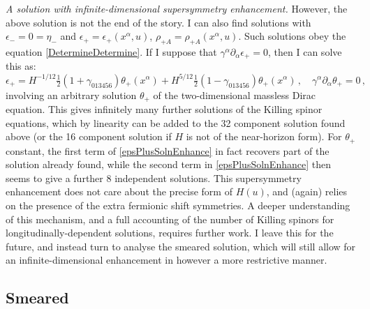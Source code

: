 \documentclass[11pt]{article}
\newcommand{\be}{\begin{equation}}
\newcommand{\ee}{\end{equation}}
\numberwithin{equation}{section}
\begin{document}
{{\vspace{1em}
\noindent \emph{A solution with infinite-dimensional supersymmetry enhancement.}
However, the above solution is not the end of the story.
I can also find solutions with $\epsilon_- = 0 = \eta_-$ and $\epsilon_+ = \epsilon_+(x^\alpha,u)$, $\rho_{+A} = \rho_{+A}(x^\alpha, u)$.
Such solutions obey the equation \eqref{DetermineDetermine}.
If I suppose that $\gamma^\alpha \partial_\alpha \epsilon_+ = 0$, then I can solve this as:
\be
\epsilon_+ = H^{-1/12} \tfrac12 ( 1 + \gamma_{013456} ) \theta_+ (x^\alpha) + H^{5/12} \tfrac12 ( 1 - \gamma_{013456} ) \theta_+ (x^\alpha) \,,\quad
\gamma^\alpha \partial_\alpha  \theta_+ = 0 \,,
\label{epsPlusSolnEnhance}
\ee
involving an arbitrary solution $\theta_+$ of the two-dimensional massless Dirac equation.
This gives infinitely many further solutions of the Killing spinor equations, which by linearity can be added to the 32 component solution found above (or the 16 component solution if $H$ is not of the near-horizon form). For $\theta_+$ constant, the first term of \eqref{epsPlusSolnEnhance} in fact recovers part of the solution already found, while the second term in \eqref{epsPlusSolnEnhance} then seems to give a further $8$ independent solutions. 
This supersymmetry enhancement does not care about the precise form of $H(u)$, and 
(again) relies on the presence of the extra fermionic shift symmetries.
A deeper understanding of this mechanism, and a full accounting of the number of Killing spinors for longitudinally-dependent solutions, requires further work.
I leave this for the future, and instead turn to analyse the smeared solution, which will still allow for an infinite-dimensional enhancement in however a more restrictive manner.

\subsection{Smeared}
\label{sec:M5smeared}

}}
\end{document}
